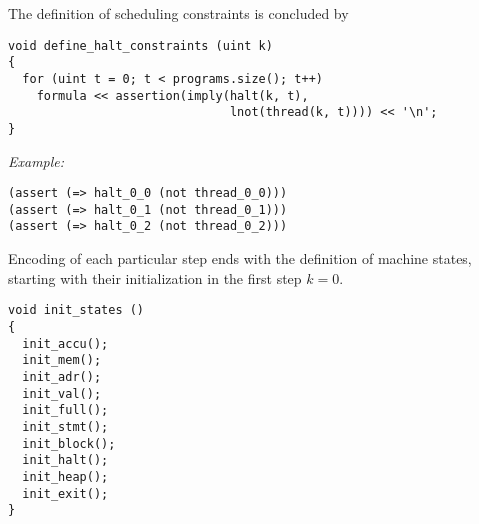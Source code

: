 
%
%

\noindent
The definition of scheduling constraints is concluded by 

\begin{lstlisting}[style=c++]
void define_halt_constraints (uint k)
{
  for (uint t = 0; t < programs.size(); t++)
    formula << assertion(imply(halt(k, t),
                               lnot(thread(k, t)))) << '\n';
}
\end{lstlisting}


\noindent
\emph{Example:} 

\begin{lstlisting}[style=smtlib]
(assert (=> halt_0_0 (not thread_0_0)))
(assert (=> halt_0_1 (not thread_0_1)))
(assert (=> halt_0_2 (not thread_0_2)))
\end{lstlisting}


\noindent
Encoding of each particular step ends with the definition of machine states,
starting with their initialization in the first step $k = 0$.

\begin{lstlisting}[style=c++]
void init_states ()
{
  init_accu();
  init_mem();
  init_adr();
  init_val();
  init_full();
  init_stmt();
  init_block();
  init_halt();
  init_heap();
  init_exit();
}
\end{lstlisting}

